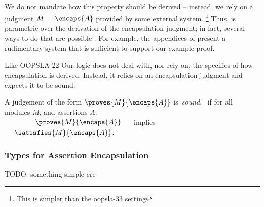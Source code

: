 We  do not mandate how this property should be derived -- instead, we rely on a judgment 
$M\ \vdash  \encaps{A}$ provided by some external system. \footnote{This is simpler than the oopsla-33 setting}
Thus, \SpecLang is parametric over the derivation of the encapsulation
     judgment; in fact, several ways to do that are possible \cite{TAME2003,ownEncaps,objInvars}. For example,
 the appendices of
    \cite{necessityFull} present a 
    rudimentary system that is sufficient to support our example
    proof.  



Like OOPSLA 22 Our logic does not {deal with, nor} rely on, the specifics of  how   encapsulation
{is derived}.
{Instead, it relies} on an encapsulation judgment and expects it to be sound:

\begin{definition}
\label{lem:encap-soundness}
A judgement of the form $\proves{M}{\encaps{A}}$  is\  \emph{sound}, \ if 
for all modules $M$, and assertions $A$:\\

$\strut \hspace{1.5cm} \proves{M}{\encaps{A}} \ \ \ \ $ implies $\ \ \ \ \satisfies{M}{\encaps{A}}$.
\end{definition}




\subsubsection{Types for Assertion Encapsulation}
\label{types}
TODO: something simple ere 

